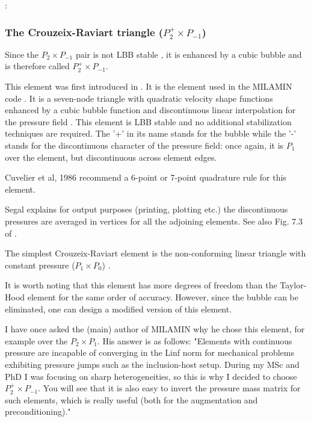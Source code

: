 \Literature: \cite{scan85,lejx14,cump20}


\subsubsection{The Crouzeix-Raviart triangle ($P_2^+\times P_{-1}$)}
\label{sec:crouzeix-raviart}

Since the $P_2\times P_{-1}$ pair is not LBB stable \cite[p179]{reddybook2}, 
it is enhanced by a cubic bubble and is therefore called $P_2^+\times P_{-1}$. 

This element was first introduced in \cite{crra73}.
It is the element used in the MILAMIN code \cite{daks08}.
It is a seven-node triangle with quadratic velocity shape 
functions enhanced by a cubic bubble function and discontinuous linear interpolation for 
the pressure field \cite{cuss86}. 
This element is LBB stable and no additional stabilization techniques are required\cite{elsw}.
The '+' in its name stands for the bubble while the '-' stands for the discontinuous
character of the pressure field: once again, it is $P_1$ over the element, but discontinuous
across element edges.

\begin{remark}
Cuvelier et al, 1986 \cite{cuss86} recommend a 6-point or 7-point quadrature rule for this element.
\end{remark}

\begin{remark}
Segal \cite{segal} explains 
for output purposes (printing, plotting etc.) the discontinuous pressures are averaged 
in vertices for all the adjoining elements. See also Fig. 7.3 of \cite{cuss86}.
\end{remark}

\begin{remark}
The simplest Crouzeix-Raviart element is the non-conforming linear triangle 
with constant pressure ($P_1\times P_0$) \cite{cuss86}. 
\end{remark}

It is worth noting that this element has more degrees of freedom  than the 
Taylor-Hood element for the same order of accuracy. However, since the 
bubble can be eliminated, one can design a modified version of this element.


\begin{remark}
I have once asked the (main) author of MILAMIN why he chose this element, for 
example over the $P_2\times P_1$. His answer is as follows:
"Elements with continuous pressure  are incapable of converging in the Linf 
norm for mechanical problems exhibiting pressure jumps such as the inclusion-host setup. 
During my MSc and PhD I was focusing on sharp heterogeneities, so this is why I decided 
to choose $P_2^+\times P_{-1}$. 
You will see that it is also easy to invert the pressure mass matrix for such elements, 
which is really useful (both for the augmentation and preconditioning)."
\end{remark}

